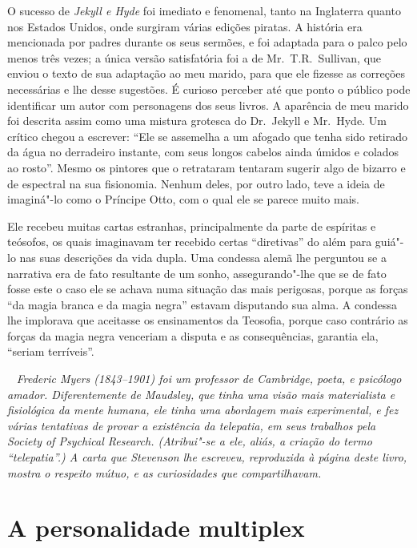 O sucesso de \textit{Jekyll e Hyde} foi imediato e fenomenal, tanto na
Inglaterra quanto nos Estados Unidos, onde surgiram várias edições
piratas.  A história era mencionada por padres durante os seus sermões,
e foi adaptada para o palco pelo menos três vezes; a única versão
satisfatória foi a de Mr.~T.R.~Sullivan, que enviou o texto de sua
adaptação ao meu marido, para que ele fizesse as correções necessárias
e lhe desse sugestões.  É curioso perceber até que ponto o público pode
identificar um autor com personagens dos seus livros.  A aparência
de meu marido foi descrita assim como uma mistura grotesca do Dr.~Jekyll 
e Mr.~Hyde.  Um crítico chegou a escrever: “Ele se assemelha a
um afogado que tenha sido retirado da água no derradeiro instante, com
seus longos cabelos ainda úmidos e colados ao rosto”.  Mesmo os
pintores que o retrataram tentaram sugerir algo de bizarro e de
espectral na sua fisionomia.  Nenhum deles, por outro lado, teve a
ideia de imaginá"-lo como o Príncipe Otto, com o qual ele se parece
muito mais.

Ele recebeu muitas cartas estranhas, principalmente da parte de
espíritas e teósofos, os quais imaginavam ter recebido certas
“diretivas” do além para guiá"-lo nas suas descrições da vida dupla. 
Uma condessa alemã lhe perguntou se a narrativa era de fato resultante
de um sonho, assegurando"-lhe que se de fato fosse este o caso ele se
achava numa situação das mais perigosas, porque as forças “da magia
branca e da magia negra” estavam disputando sua alma.  A condessa lhe
implorava que aceitasse os ensinamentos da Teosofia, porque caso contrário as
forças da magia negra venceriam a disputa e as consequências, garantia
ela, “seriam terríveis”.  


\clearpage
\ifodd\thepage ~ \clearpage\else\relax\fi
\thispagestyle{empty}
\mbox{}\vfill
{\noindent\itshape Frederic Myers (1843--1901) foi um professor de Cambridge, poeta,
e psicólogo amador.  Diferentemente de Maudsley, que tinha uma visão
mais materialista e fisiológica da mente humana, ele tinha uma
abordagem mais experimental, e fez várias tentativas de provar a
existência da telepatia, em seus trabalhos pela Society of Psychical
Research. (Atribui"-se a ele, aliás, a criação do termo “telepatia”.) A
carta que Stevenson lhe escreveu, reproduzida à página \pageref{cartastev} deste		
livro, mostra o respeito mútuo, e as curiosidades que
compartilhavam.}

\chapter[A personalidade multiplex\\ \textit{Frederic Myers}]{A personalidade multiplex}

